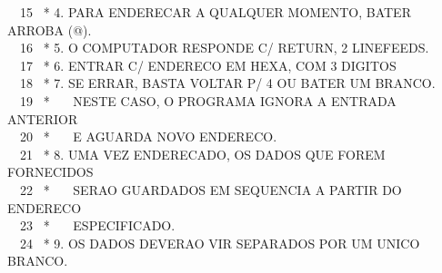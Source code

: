 \documentclass[a4paper,12pt]{article}
\begin{document}
\phantom \ \ 15 \ * 4. PARA ENDERECAR A QUALQUER MOMENTO, BATER ARROBA (@).\\
\phantom \ \ 16 \ * 5. O COMPUTADOR RESPONDE C/ RETURN, 2 LINEFEEDS.\\
\phantom \ \ 17 \ * 6. ENTRAR C/ ENDERECO EM HEXA, COM 3 DIGITOS\\
\phantom \ \ 18 \ * 7. SE ERRAR, BASTA VOLTAR P/ 4 OU BATER UM BRANCO.\\
\phantom \ \ 19 \ * \ \ \ NESTE CASO, O PROGRAMA IGNORA A ENTRADA ANTERIOR\\
\phantom \ \ 20 \ * \ \ \ E AGUARDA NOVO ENDERECO.\\
\phantom \ \ 21 \ * 8. UMA VEZ ENDERECADO, OS DADOS QUE FOREM FORNECIDOS\\
\phantom \ \ 22 \ * \ \ \ SERAO GUARDADOS EM SEQUENCIA A PARTIR DO ENDERECO\\
\phantom \ \ 23 \ * \ \ \ ESPECIFICADO.\\
\phantom \ \ 24 \ * 9. OS DADOS DEVERAO VIR SEPARADOS POR UM UNICO BRANCO.

\newpage

\noindent \\
\end{document}
